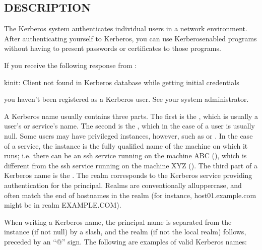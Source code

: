 \documentclass[letterpaper,10pt,english]{sphinxmanual}
\begin{document}
\subsection{DESCRIPTION}
\label{\detokenize{user/user_config/kerberos:description}}
\sphinxAtStartPar
The Kerberos system authenticates individual users in a network
environment.  After authenticating yourself to Kerberos, you can use
Kerberos\sphinxhyphen{}enabled programs without having to present passwords or
certificates to those programs.

\sphinxAtStartPar
If you receive the following response from {\hyperref[\detokenize{user/user_commands/kinit:kinit-1}]{}}:

\sphinxAtStartPar
kinit: Client not found in Kerberos database while getting initial
credentials

\sphinxAtStartPar
you haven’t been registered as a Kerberos user.  See your system
administrator.

\sphinxAtStartPar
A Kerberos name usually contains three parts.  The first is the
, which is usually a user’s or service’s name.  The second
is the , which in the case of a user is usually null.
Some users may have privileged instances, however, such as  or
.  In the case of a service, the instance is the fully
qualified name of the machine on which it runs; i.e. there can be an
ssh service running on the machine ABC (), which is
different from the ssh service running on the machine XYZ
().  The third part of a Kerberos name is the .
The realm corresponds to the Kerberos service providing authentication
for the principal.  Realms are conventionally all\sphinxhyphen{}uppercase, and often
match the end of hostnames in the realm (for instance, host01.example.com
might be in realm EXAMPLE.COM).

\sphinxAtStartPar
When writing a Kerberos name, the principal name is separated from the
instance (if not null) by a slash, and the realm (if not the local
realm) follows, preceded by an “@” sign.  The following are examples
of valid Kerberos names:

\begin{sphinxVerbatim}[commandchars=\\\{\}]
\end{sphinxVerbatim}
\end{document}
